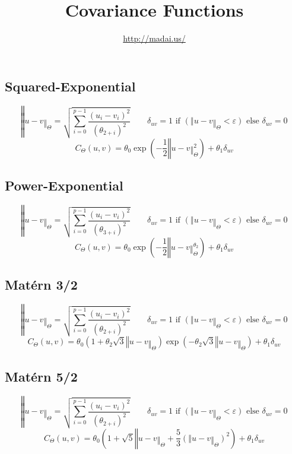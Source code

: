 \documentclass{article}
\title{Covariance Functions}
\author{\url{http://madai.us/}}
\begin{document}
\maketitle


\subsection*{Squared-Exponential}

\[ ‖u-v‖_Θ = \sqrt{\sum_{i=0}^{p-1} \frac{(u_i - v_i)^2}{(θ_{2+i})^2}} \qquad
 δ_{uv} = 1 \text{ if } (‖u-v‖_Θ < ε) \textrm{ else } δ_{uv} = 0 \]
\[ C_Θ(u, v) = θ_0 \exp\left({-\frac{1}{2} ‖u-v‖_Θ^2}\right) + θ_1δ_{uv} \]

\subsection*{Power-Exponential}

\[ ‖u-v‖_Θ = \sqrt{\sum_{i=0}^{p-1} \frac{(u_i - v_i)^2}{(θ_{3+i})^2}} \qquad
 δ_{uv} = 1 \text{ if } (‖u-v‖_Θ < ε) \textrm{ else } δ_{uv} = 0 \]
\[ C_Θ(u, v) = θ_0 \exp\left({-\frac{1}{2} ‖u-v‖_Θ^{θ_2}}\right) + θ_1δ_{uv} \]

\subsection*{Matérn 3/2}
\[ ‖u-v‖_Θ = \sqrt{\sum_{i=0}^{p-1} \frac{(u_i - v_i)^2}{(θ_{2+i})^2}} \qquad
 δ_{uv} = 1 \text{ if } (‖u-v‖_Θ < ε) \textrm{ else } δ_{uv} = 0 \]
\[ C_Θ(u, v) = {θ_0} \left({ 1 + θ_2 \sqrt{3} ‖u-v‖_Θ }\right)
\exp \left({ - θ_2 \sqrt{3} ‖u-v‖_Θ }\right) + θ_1δ_{uv} \]


\subsection*{Matérn 5/2}
\[ ‖u-v‖_Θ = \sqrt{\sum_{i=0}^{p-1} \frac{(u_i - v_i)^2}{(θ_{2+i})^2}} \qquad
 δ_{uv} = 1 \text{ if } (‖u-v‖_Θ < ε) \textrm{ else } δ_{uv} = 0 \]
\[ C_Θ(u, v) = {θ_0} \left({ 1 + \sqrt{5} ‖u-v‖_Θ
 + \dfrac{5}{3} \left({‖u-v‖_Θ}\right)^2  }\right) + θ_1δ_{uv} \]
\end{document}
